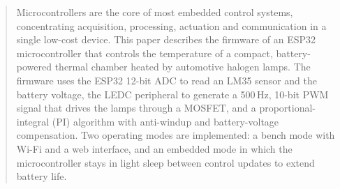 \begin{abstract}
Microcontrollers are the core of most embedded control systems, concentrating acquisition,
processing, actuation and communication in a single low-cost device. This paper describes the
firmware of an ESP32 microcontroller that controls the temperature of a compact, battery-powered
thermal chamber heated by automotive halogen lamps. The firmware uses the ESP32 12-bit ADC to read
an LM35 sensor and the battery voltage, the LEDC peripheral to generate a 500\,Hz, 10-bit PWM
signal that drives the lamps through a MOSFET, and a proportional-integral (PI) algorithm with
anti-windup and battery-voltage compensation. Two operating modes are implemented: a bench mode
with Wi-Fi and a web interface, and an embedded mode in which the microcontroller stays in light
sleep between control updates to extend battery life. 
\end{abstract}

